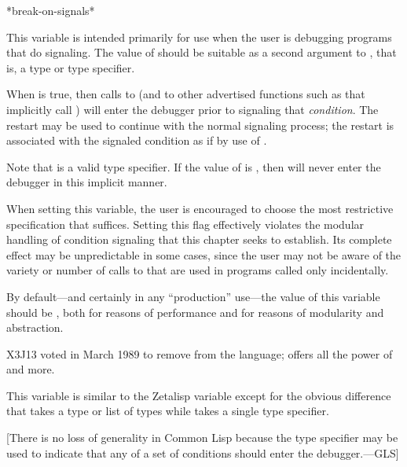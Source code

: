 \begin{defun}[Variable]
*break-on-signals*

  This variable is intended primarily for use when the user is debugging
  programs that do signaling.
  The value of  should be suitable as a second argument to
  , that is, a type or type specifier.

  When  is true, then calls to
   (and to other advertised functions such as  that
  implicitly call ) will enter the debugger prior to signaling
  that {\it condition}. The  restart may be used to continue with
  the normal signaling process;
the restart is associated with the signaled condition as if by
use of .

  Note that  is a valid type specifier.  If the value of
   is , then  will never
  enter the debugger in this implicit manner.

  When setting this variable, the user is encouraged to choose the
  most restrictive specification that suffices. Setting this flag
  effectively violates the modular handling of condition signaling
  that this chapter seeks to establish. Its complete effect may be
  unpredictable in some cases, since the user may not be aware of the
  variety or number of calls to  that are used in programs
  called only incidentally.

  By default---and certainly in any ``production'' use---the value
  of this variable should be , both for reasons of performance and
  for reasons of modularity and abstraction.

\begin{newer}
X3J13 voted in March 1989
to remove  from the language;
 offers all the power of
   and more.
\end{newer}

\beforenoterule
  \begin{incompatibility}
  This variable is similar to the Zetalisp
  variable  except for the obvious difference that
   takes a type or list of types while
   takes a single type specifier.

  [There is no loss of generality in Common Lisp
  because the  type specifier may be used to indicate that
  any of a set of conditions should enter the debugger.---GLS]
  \end{incompatibility}
\afternoterule
\end{defun}



